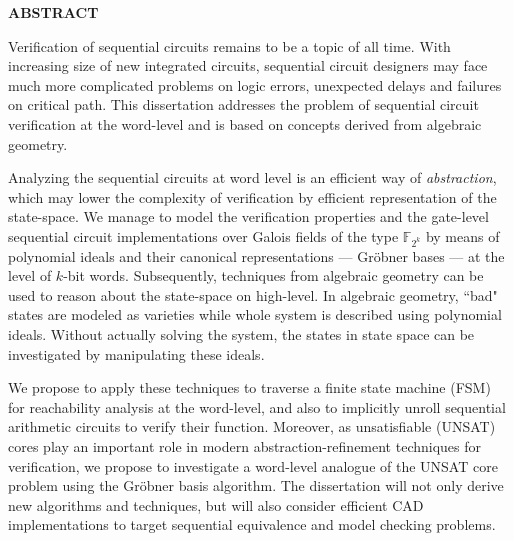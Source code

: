 \begin{center}{\bf ABSTRACT}\end{center}

Verification of sequential circuits remains to be a topic of all time. With increasing size of new
integrated circuits, sequential circuit designers may face much more complicated problems on 
logic errors, unexpected delays and failures on critical path. 
This dissertation addresses the problem of sequential circuit verification at the word-level
and is based on concepts derived from algebraic geometry. 

Analyzing the sequential circuits at word level is an efficient way
of {\it abstraction}, which may lower the complexity of verification by efficient representation of the
state-space. We manage to model the verification properties and the gate-level sequential circuit 
implementations over Galois fields of the type ${\mathbb{F}}_{2^k}$ by means of polynomial ideals and 
their canonical representations --- Gr\"obner bases --- at the level of $k$-bit words. Subsequently, 
techniques from algebraic geometry can be used to reason about the state-space on high-level.
In algebraic geometry, ``bad" states are modeled as varieties while whole system is described using 
polynomial ideals. Without actually solving the system, the states in state space can be investigated 
by manipulating these ideals. 

We propose to apply these techniques to traverse a finite state machine (FSM) for reachability 
analysis at the word-level, and also to implicitly unroll sequential arithmetic circuits to 
verify their function. Moreover, as unsatisfiable (UNSAT) cores play an important role in modern 
abstraction-refinement techniques for verification, we propose to investigate a word-level 
analogue of the UNSAT core problem using the  Gr\"obner basis algorithm. The dissertation will 
not only derive new algorithms and techniques, but will also consider efficient CAD 
implementations to target sequential equivalence and model checking problems. 
